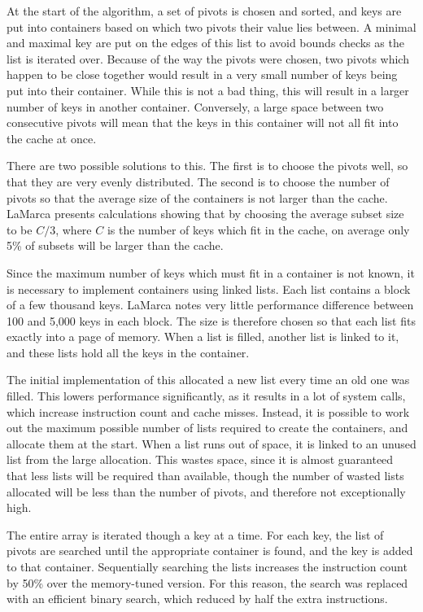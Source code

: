 At the start of the algorithm, a set of pivots is chosen and sorted, and keys
are put into containers based on which two pivots their value lies between. A
minimal and maximal key are put on the edges of this list to avoid bounds checks
as the list is iterated over. Because of the way the pivots were chosen, two
pivots which happen to be close together would result in a very small number of
keys being put into their container. While this is not a bad thing, this will
result in a larger number of keys in another container. Conversely, a large
space between two consecutive pivots will mean that the keys in this
container will not all fit into the cache at once.

There are two possible solutions to this. The first is to choose the pivots
well, so that they are very evenly distributed. The second is to choose the
number of pivots so that the average size of the containers is not larger than
the cache. LaMarca presents calculations showing that by choosing the average
subset size to be $C/3$, where $C$ is the number of keys which fit in the
cache, on average only 5\% of subsets will be larger than the cache.

Since the maximum number of keys which must fit in a container is not known, it
is necessary to implement containers using linked lists. Each list contains a
block of a few thousand keys. LaMarca notes very little performance difference
between 100 and 5,000 keys in each block. The size is therefore chosen so that
each list fits exactly into a page of memory. When a list is filled, another
list is linked to it, and these lists hold all the keys in the container.

The initial implementation of this allocated a new list every time an old one
was filled. This lowers performance significantly, as it results in a lot of
system calls, which increase instruction count and cache misses. Instead, it is
possible to work out the maximum possible number of lists required to create the
containers, and allocate them at the start. When a list runs out of space, it is
linked to an unused list from the large allocation. This wastes space, since it
is almost guaranteed that less lists will be required than available, though the
number of wasted lists allocated will be less than the number of pivots, and
therefore not exceptionally high.

The entire array is iterated though a key at a time. For each key, the list
of pivots are searched until the appropriate container is found, and the key is
added to that container. Sequentially searching the lists increases the
instruction count by 50\% over the memory-tuned version. For this reason, the
search was replaced with an efficient binary search, which reduced by half the
extra instructions.

